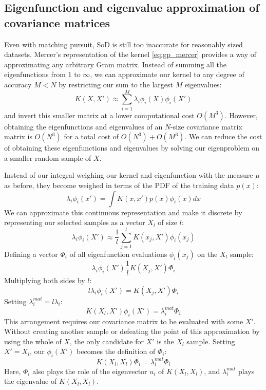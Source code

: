\subsection{Eigenfunction and eigenvalue approximation of covariance matrices}
Even with matching pursuit, SoD is still too inaccurate for reasonably sized datasets. Mercer's representation of the kernel \ref{eq:gp_mercer} provides a way of approximating any arbitrary Gram matrix. Instead of summing all the eigenfunctions from 1 to $\infty$, we can approximate our kernel to any degree of accuracy $M < N$ by restricting our sum to the largest $M$ eigenvalues:
\begin{equation} \label{eq:gp_mercer_approx}
    K(X, X') \approx \sum_{i=1}^{M} \lambda_i \phi_i(X) \phi_i(X')
\end{equation}
and invert this smaller matrix at a lower computational cost $O(M^3)$. However, obtaining the eigenfunctions and eigenvalues of an $N$-size covariance matrix matrix is $O(N^3)$ for a total cost of $O(N^3) + O(M^3)$. We can reduce the cost of obtaining these eigenfunctions and eigenvalues by solving our eigenproblem on a smaller random sample of $X$. 

Instead of our integral weighing our kernel and eigenfunction with the measure $\mu$ as before, they become weighed in terms of the PDF of the training data $p(x)$:
\begin{equation*}
    \lambda_i \phi_i(x') = \int K(x, x') p(x) \phi_i(x) dx
\end{equation*}
We can approximate this continuous representation and make it discrete by representing our selected samples as a vector $X_l$ of size $l$:
\begin{equation*}
    \lambda_i \phi_i(X') \approx \frac{1}{l} \sum_{j=1}^{l} K(x_j, X') \phi_i(x_j)
\end{equation*}
Defining a vector $\Phi_i$ of all eigenfunction evaluations $\phi_i(x_j)$ on the $X_l$ sample:
\begin{equation*}
    \lambda_i \phi_i(X') \frac{1}{l} K(X_j, X') \Phi_i
\end{equation*}
Multiplying both sides by $l$:
\begin{equation*}
    l \lambda_i \phi_i(X') = K(X_j, X') \Phi_i
\end{equation*}
Setting $\lambda_i^{mat} = l \lambda_i$:
\begin{equation*}
    K(X_l, X') \phi_i(X') = \lambda_i^{mat} \Phi_i
\end{equation*}
This arrangement requires our covariance matrix to be evaluated with some $X'$. Without creating another sample or defeating the point of this approximation by using the whole of $X$, the only candidate for $X'$ is the $X_l$ sample. Setting $X' = X_l$, our $\phi_i(X')$ becomes the definition of $\Phi_i$:
\begin{equation} \label{eq:eigenproblem_sampled}
    K(X_l, X_l) \Phi_i = \lambda_i^{mat} \Phi_i
\end{equation}
Here, $\Phi_i$ also plays the role of the eigenvector $u_i$ of $K(X_l, X_l)$, and $\lambda_i^{mat}$ plays the eigenvalue of $K(X_l, X_l)$. 

